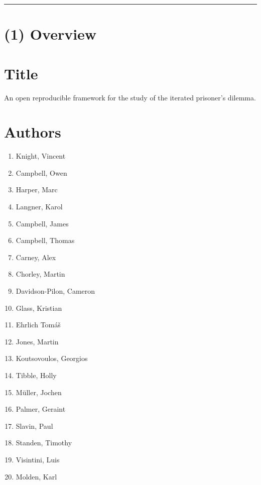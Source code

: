 \documentclass{jors}
\begin{document}
\pagestyle{fancy}
\renewcommand\headrule{}
\rhead{\textcolor{gray}{UP JORS software Latex paper template version 0.1}}

\rule{\textwidth}{1pt}

\section*{(1) Overview}\label{sec:sec:overview}

\vspace{0.5cm}

\section*{Title}

An open reproducible framework for the study of the iterated prisoner's
dilemma.

\section*{Authors}

\begin{multicols}{2}
    \begin{enumerate}[noitemsep,topsep=0pt]
        \item Knight, Vincent
        \item Campbell, Owen
        \item Harper, Marc
        \item Langner, Karol
        \item Campbell, James
        \item Campbell, Thomas
        \item Carney, Alex
        \item Chorley, Martin
        \item Davidson-Pilon, Cameron
        \item Glass, Kristian
        \item Ehrlich Tom{\'a}{\v s}
        \item Jones, Martin
        \item Koutsovoulos, Georgios
        \item Tibble, Holly
        \item M{\"u}ller, Jochen
        \item Palmer, Geraint
        \item Slavin, Paul
        \item Standen, Timothy
        \item Visintini, Luis
        \item Molden, Karl
    \end{enumerate}
\end{multicols}
\end{document}
